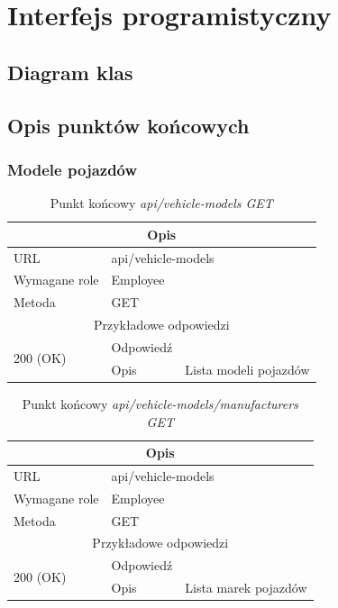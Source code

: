 \documentclass[eng,printmode,openany]{mgr}
\begin{document}
	\section{Interfejs programistyczny}
	\subsection{Diagram klas}
	
	\subsection{Opis punktów końcowych}
	\subsubsection{Modele pojazdów}
	\begin{table}[H]
		\caption{Punkt końcowy \textit{api/vehicle-models GET}}
		\begin{tabularx}{\textwidth}{|l|l|X|}
			\hline
			\multicolumn{3}{|c|}{Opis}                         						\\ \hline
			URL                       & \multicolumn{2}{l|}{api/vehicle-models} 	\\ \hline
			Wymagane role             & \multicolumn{2}{l|}{Employee} \\ \hline
			Metoda                    & \multicolumn{2}{l|}{GET} 					\\ \hline
			\multicolumn{3}{|c|}{ Przykładowe odpowiedzi}                   		\\ \hline
			\multirow{2}{*}{200 (OK)} 			& Odpowiedź     &        \\ \cline{2-3} 
			& Opis         	& Lista modeli pojazdów       											\\ \hline
		\end{tabularx}
	\end{table}
	
	\begin{table}[H]
		\caption{Punkt końcowy \textit{api/vehicle-models/manufacturers GET}}
		\begin{tabularx}{\textwidth}{|l|l|X|}
			\hline
			\multicolumn{3}{|c|}{Opis}                         						\\ \hline
			URL                       & \multicolumn{2}{l|}{api/vehicle-models} 	\\ \hline
			Wymagane role             & \multicolumn{2}{l|}{Employee} \\ \hline
			Metoda                    & \multicolumn{2}{l|}{GET} 					\\ \hline
			\multicolumn{3}{|c|}{ Przykładowe odpowiedzi}                   		\\ \hline
			\multirow{2}{*}{200 (OK)} 			& Odpowiedź     &      \\ \cline{2-3} 
			& Opis         	& Lista marek pojazdów       														\\ \hline
		\end{tabularx}
	\end{table}
	
\end{document}
